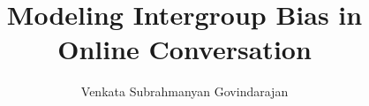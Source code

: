 \author{Venkata Subrahmanyan Govindarajan}  	%

\address{venkatasg@utexas.edu}  %

\title{Modeling Intergroup Bias in Online Conversation} %


%
%
%
%
%
%

%
%
%
%
%
%
